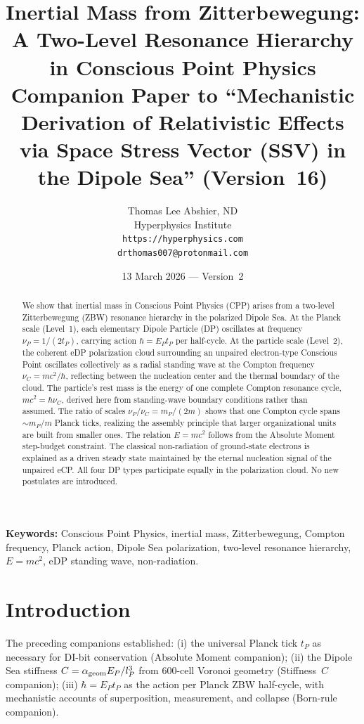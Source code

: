 \documentclass[12pt]{article}
\title{\textbf{Inertial Mass from Zitterbewegung:\\
A Two-Level Resonance Hierarchy in Conscious Point Physics}\\[6pt]
{\large Companion Paper to ``Mechanistic Derivation of Relativistic Effects\\
via Space Stress Vector (SSV) in the Dipole Sea'' (Version~16)}}
\author{Thomas Lee Abshier, ND\\
Hyperphysics Institute\\
\texttt{https://hyperphysics.com}\\
\texttt{drthomas007@protonmail.com}}
\date{13 March 2026 --- Version~2}
\newcommand{\lP}{l_P}
\newcommand{\EP}{E_P}
\newcommand{\tP}{t_P}
\newcommand{\mP}{m_P}
\newcommand{\nuP}{\nu_P}
\newcommand{\nuC}{\nu_C}
\newcommand{\alphageom}{\alpha_{\rm geom}}
\begin{document}
\maketitle

\noindent\textbf{Keywords:} Conscious Point Physics, inertial mass,
Zitterbewegung, Compton frequency, Planck action, Dipole Sea polarization,
two-level resonance hierarchy, $E = mc^2$, eDP standing wave, non-radiation.

\begin{abstract}
We show that inertial mass in Conscious Point Physics (CPP) arises from a
two-level Zitterbewegung (ZBW) resonance hierarchy in the polarized Dipole
Sea.  At the Planck scale (Level~1), each elementary Dipole Particle (DP)
oscillates at frequency $\nuP = 1/(2\tP)$, carrying action $\hbar =
\EP\tP$ per half-cycle.  At the particle scale (Level~2), the coherent eDP
polarization cloud surrounding an unpaired electron-type Conscious Point
oscillates collectively as a radial standing wave at the Compton frequency
$\nuC = mc^2/\hbar$, reflecting between the nucleation center and the
thermal boundary of the cloud.  The particle's rest mass is the energy of
one complete Compton resonance cycle, $mc^2 = \hbar\nuC$, derived here from
standing-wave boundary conditions rather than assumed.  The ratio of scales
$\nuP/\nuC = \mP/(2m)$ shows that one Compton cycle spans $\sim\mP/m$
Planck ticks, realizing the assembly principle that larger organizational
units are built from smaller ones.  The relation $E = mc^2$ follows from
the Absolute Moment step-budget constraint.  The classical non-radiation of
ground-state electrons is explained as a driven steady state maintained by
the eternal nucleation signal of the unpaired eCP.  All four DP types
participate equally in the polarization cloud.  No new postulates are
introduced.
\end{abstract}

\section{Introduction}
\label{sec:intro}

The preceding companions established:
(i) the universal Planck tick $\tP$ as necessary for DI-bit conservation
(Absolute Moment companion);
(ii) the Dipole Sea stiffness $C = \alphageom\EP/\lP^3$ from 600-cell
Voronoi geometry (Stiffness~$C$ companion);
(iii) $\hbar = \EP\tP$ as the action per Planck ZBW half-cycle, with
mechanistic accounts of superposition, measurement, and collapse (Born-rule
companion).
\end{document}

